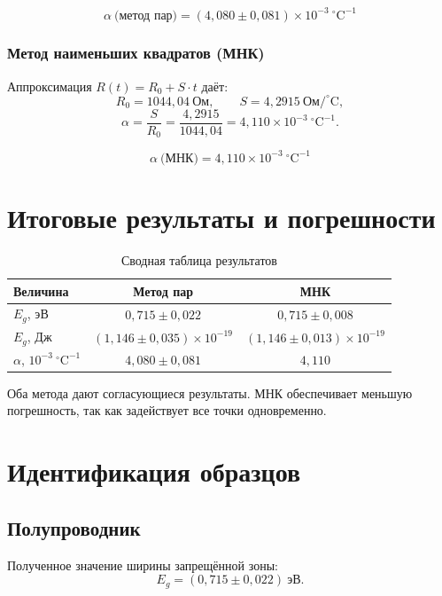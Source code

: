 \documentclass[a4paper,14pt]{article}
\begin{document}
\[
    \boxed{\alpha\ \text{(метод пар)} = (4{,}080 \pm 0{,}081)\times10^{-3}\ ^{\circ}\mathrm{C}^{-1}}
\]

\subsubsection*{Метод наименьших квадратов (МНК)}

Аппроксимация $R(t) = R_0 + S\cdot t$ даёт:
\[
    R_0 = 1044{,}04\ \text{Ом}, \qquad S = 4{,}2915\ \text{Ом}/^{\circ}\mathrm{C},
\]
\[
    \alpha = \frac{S}{R_0} = \frac{4{,}2915}{1044{,}04} = 4{,}110\times10^{-3}\ ^{\circ}\mathrm{C}^{-1}.
\]

\[
    \boxed{\alpha\ \text{(МНК)} = 4{,}110\times10^{-3}\ ^{\circ}\mathrm{C}^{-1}}
\]

\section{Итоговые результаты и погрешности}

\begin{table}[H]
\centering
\caption{Сводная таблица результатов}
\label{tab:results}
\begin{tabular}{|l|c|c|}
\hline
\textbf{Величина} & \textbf{Метод пар} & \textbf{МНК} \\
\hline
$E_g$, эВ & $0{,}715 \pm 0{,}022$ & $0{,}715 \pm 0{,}008$ \\
$E_g$, Дж & $(1{,}146 \pm 0{,}035)\times10^{-19}$ & $(1{,}146 \pm 0{,}013)\times10^{-19}$ \\
$\alpha$, $10^{-3}\ ^{\circ}\mathrm{C}^{-1}$ & $4{,}080 \pm 0{,}081$ & $4{,}110$ \\
\hline
\end{tabular}
\end{table}

Оба метода дают согласующиеся результаты. МНК обеспечивает меньшую погрешность, так как задействует все точки одновременно.

\section{Идентификация образцов}

\subsection*{Полупроводник}

Полученное значение ширины запрещённой зоны:
\[
    E_g = (0{,}715 \pm 0{,}022)\ \text{эВ}.
\]
\end{document}
